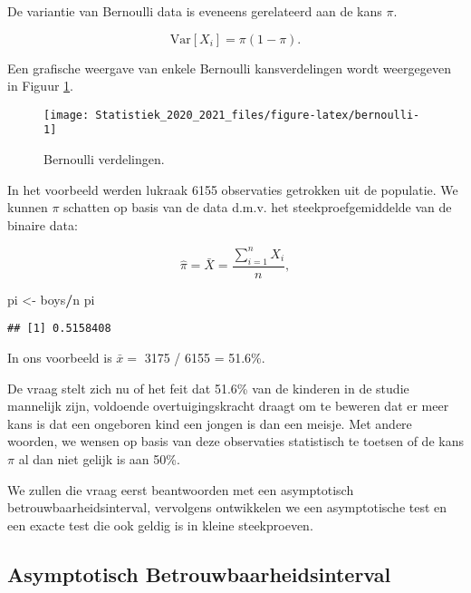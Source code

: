 \documentclass[
  12pt,dutch,coursenotes]{book}
\newenvironment{Shaded}{\begin{snugshade}}{\end{snugshade}}
\newcommand{\NormalTok}[1]{#1}
\newcommand{\OperatorTok}[1]{\textcolor[rgb]{0.81,0.36,0.00}{\textbf{#1}}}
\newcommand{\StringTok}[1]{\textcolor[rgb]{0.31,0.60,0.02}{#1}}
\theoremstyle{definition}
\theoremstyle{definition}
\theoremstyle{definition}
\theoremstyle{remark}
\begin{document}
De variantie van Bernoulli data is eveneens gerelateerd aan de kans \(\pi\).

\[\text{Var}[X_i]=\pi (1-\pi).\]

Een grafische weergave van enkele Bernoulli kansverdelingen wordt weergegeven in Figuur \ref{fig:bernoulli}.

\begin{figure}

{\centering \texttt{[image: Statistiek\_2020\_2021\_files/figure-latex/bernoulli-1]} 

}

\caption{Bernoulli verdelingen.}\label{fig:bernoulli}
\end{figure}

In het voorbeeld werden lukraak
6155 observaties getrokken uit de populatie.
We kunnen \(\pi\) schatten op basis van de data d.m.v. het steekproefgemiddelde van de binaire data:

\[\hat \pi = \bar X = \frac{\sum\limits_{i=1}^n X_i}{n},\]

\begin{Shaded}
\begin{Highlighting}[]
\NormalTok{pi \textless{}{-}}\StringTok{ }\NormalTok{boys}\OperatorTok{/}\NormalTok{n}
\NormalTok{pi}
\end{Highlighting}
\end{Shaded}

\begin{verbatim}
## [1] 0.5158408
\end{verbatim}

In ons voorbeeld is \(\bar x =\) 3175 / 6155 = 51.6\%.

De vraag stelt zich nu of het feit dat 51.6\% van de kinderen in de studie mannelijk zijn, voldoende overtuigingskracht draagt om te beweren dat er meer kans is dat een ongeboren kind een jongen is dan een meisje. Met andere woorden, we wensen op basis van deze observaties statistisch te toetsen of de kans \(\pi\) al dan niet gelijk is aan 50\%.

We zullen die vraag eerst beantwoorden met een asymptotisch betrouwbaarheidsinterval, vervolgens ontwikkelen we een asymptotische test en een exacte test die ook geldig is in kleine steekproeven.

\hypertarget{asymptotisch-betrouwbaarheidsinterval}{%
\subsection{Asymptotisch Betrouwbaarheidsinterval}\label{asymptotisch-betrouwbaarheidsinterval}}
\end{document}
